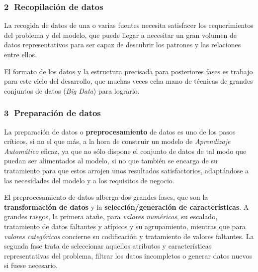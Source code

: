 \documentclass[00-Trabajo_Final.tex]{subfiles}
\begin{document}
\subsubsection*{\centering\textcircled{2} Recopilación de datos}
La recogida de datos de una o varias fuentes necesita satisfacer los requerimientos del problema y del modelo, que puede llegar a necesitar un gran volumen de datos representativos para ser capaz de descubrir los patrones y las relaciones entre ellos.

El formato de los datos y la estructura precisada para posteriores fases es trabajo para este ciclo del desarrollo, que muchas veces echa mano de técnicas de grandes conjuntos de datos (\textit{Big Data}) para lograrlo.

\subsubsection*{\centering\textcircled{3} Preparación de datos}
La preparación de datos o \textbf{preprocesamiento} de datos es uno de los pasos críticos, si no el que más, a la hora de construir un modelo de \textit{Aprendizaje Automático} eficaz, ya que no sólo dispone el conjunto de datos de tal modo que puedan ser alimentados al modelo, si no que también se encarga de su tratamiento para que estos arrojen unos resultados satisfactorios, adaptándose a las necesidades del modelo y a los requisitos de negocio.

El preprocesamiento de datos alberga dos grandes fases, que son la \textbf{transformación de datos} y la \textbf{selección/generación de características}. A grandes rasgos, la primera atañe, para \textit{valores numéricos}, su escalado, tratamiento de datos faltantes y atípicos y su agrupamiento, mientras que para \textit{valores categóricos} concierne su codificación y tratamiento de valores faltantes. La segunda fase trata de seleccionar aquellos atributos y características representativas del problema, filtrar los datos incompletos o generar datos nuevos si fuese necesario.
\end{document}
